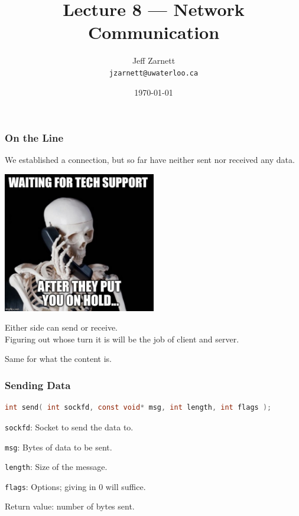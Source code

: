 

\title{Lecture 8 --- Network Communication }

\author{Jeff Zarnett \\ \small \texttt{jzarnett@uwaterloo.ca}}
\date{\today}




\begin{frame}
  \titlepage

 \end{frame}



\begin{frame}
\frametitle{On the Line}

We established a connection, but so far have neither sent nor received any data.

\begin{center}
\includegraphics[width=0.5\textwidth]{images/onhold.jpg}
\end{center}

Either side can send or receive.\\
\quad Figuring out whose turn it is will be the job of client and server.

Same for what the content is.

\end{frame}



\begin{frame}[fragile]
\frametitle{Sending Data}

\begin{lstlisting}[language=C]
int send( int sockfd, const void* msg, int length, int flags );
\end{lstlisting}

\texttt{sockfd}: Socket to send the data to.

\texttt{msg}: Bytes of data to be sent.

\texttt{length}: Size of the message.

\texttt{flags}: Options; giving in 0 will suffice.

Return value: number of bytes sent.

\end{frame}



